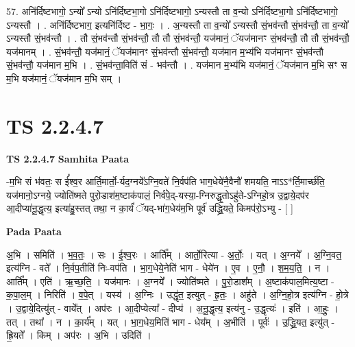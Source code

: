 \documentclass[17pt]{extarticle}
\begin{document}
57. अनि॑र्दिष्टभागो॒ ऽन्यो᳚ ऽन्यो ऽनि॑र्दिष्टभा॒गो ऽनि॑र्दिष्टभागो॒ ऽन्यस्तौ ता व॒न्यो ऽनि॑र्दिष्टभा॒गो ऽनि॑र्दिष्टभागो॒ ऽन्यस्तौ । . अनि॑र्दिष्टभाग॒ इत्यनि॑र्दिष्ट - भा॒गः॒ । . अ॒न्यस्तौ ता व॒न्यो᳚ ऽन्यस्तौ सं॒भव॑न्तौ सं॒भव॑न्तौ॒ ता व॒न्यो᳚ ऽन्यस्तौ सं॒भव॑न्तौ । . तौ सं॒भव॑न्तौ सं॒भव॑न्तौ॒ तौ तौ सं॒भव॑न्तौ॒ यज॑मानं॒ ॅयज॑मानꣳ सं॒भव॑न्तौ॒ तौ तौ सं॒भव॑न्तौ॒ यज॑मानम् । . सं॒भव॑न्तौ॒ यज॑मानं॒ ॅयज॑मानꣳ सं॒भव॑न्तौ सं॒भव॑न्तौ॒ यज॑मान म॒भ्य॑भि यज॑मानꣳ सं॒भव॑न्तौ सं॒भव॑न्तौ॒ यज॑मान म॒भि । . सं॒भव॑न्ता॒विति॑ सं - भव॑न्तौ । . यज॑मान म॒भ्य॑भि यज॑मानं॒ ॅयज॑मान म॒भि सꣳ स म॒भि यज॑मानं॒ ॅयज॑मान म॒भि सम् । \newline
\pagebreak
{}

\section{ TS 2.2.4.7 }

\textbf{TS 2.2.4.7 } \newline
\textbf{Samhita Paata} \newline

-म॒भि सं भ॑वतः॒ स ई᳚श्व॒र आर्ति॒मार्तो॒-र्यद॒ग्नये᳚ऽग्नि॒वते॑ नि॒र्वप॑ति भाग॒धेये॑नै॒वैनौ॑ शमयति॒ नाऽऽ*र्ति॒मार्च्छ॑ति॒ यज॑मानो॒ऽग्नये॒ ज्योति॑ष्मते पुरो॒डाश॑म॒ष्टाक॑पालं॒ निर्व॑पे॒द्-यस्या॒-ग्निरुद्धृ॒तोऽहु॑ते-ऽग्निहो॒त्र उ॒द्वाये॒दप॑र आ॒दीप्या॑नू॒द्धृत्य॒ इत्या॑हु॒स्तत् तथा॒ न का॒र्यं॑ ॅयद्-भा॑ग॒धेय॑म॒भि पूर्व॑ उद्ध्रि॒यते॒ किमप॑रो॒ऽभ्यु - [  ] \newline

\textbf{Pada Paata} \newline

अ॒भि । समिति॑ । भ॒व॒तः॒ । सः । ई॒श्व॒रः । आर्ति᳚म् । आर्तो॒रित्या - अ॒र्तोः॒ । यत् । अ॒ग्नये᳚ । अ॒ग्नि॒वत॒ इत्य॑ग्नि - वते᳚ । नि॒र्वप॒तीति॑ निः-वप॑ति । भा॒ग॒धेये॒नेति॑ भाग - धेये॑न । ए॒व । ए॒नौ॒ । श॒म॒य॒ति॒ । न । आर्ति᳚म् । एति॑ । ऋ॒च्छ॒ति॒ । यज॑मानः । अ॒ग्नये᳚ । ज्योति॑ष्मते । पु॒रो॒डाश᳚म् । अ॒ष्टाक॑पाल॒मित्य॒ष्टा - क॒पा॒ल॒म् । निरिति॑ । व॒पे॒त् । यस्य॑ । अ॒ग्निः । उद्धृ॑त॒ इत्युत् - हृ॒तः॒ । अहु॑ते । अ॒ग्नि॒हो॒त्र इत्य॑ग्नि - हो॒त्रे । उ॒द्वाये॒दित्यु॑त् - वाये᳚त् । अप॑रः । आ॒दीप्येत्या᳚ - दीप्य॑ । अ॒नू॒द्धृत्य॒ इत्य॑नु - उ॒द्धृत्यः॑ । इति॑ । आ॒हुः॒ । तत् । तथा᳚ । न । का॒र्य᳚म् । यत् । भा॒ग॒धेय॒मिति॑ भाग - धेय᳚म् । अ॒भीति॑ । पूर्वः॑ । उ॒द्ध्रि॒यत॒ इत्यु॑त् - ह्रि॒यते᳚ । किम् । अप॑रः । अ॒भि । उदिति॑ ।  \newline
\end{document}
